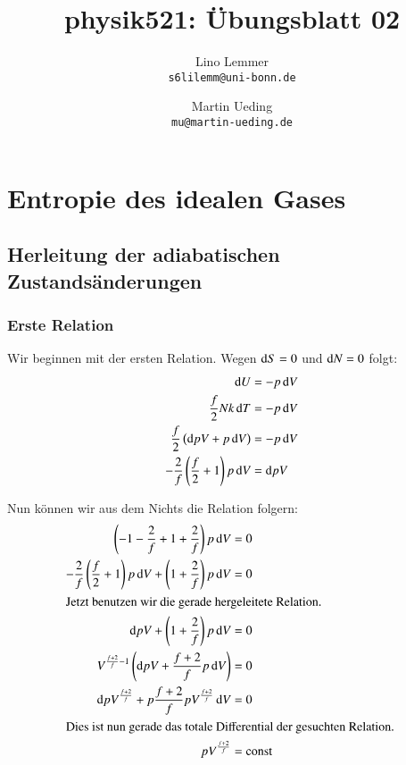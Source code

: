 

\setcounter{section}{1}
\renewcommand\thesection{H\,2.\arabic{section}}
\renewcommand\thesubsection{\thesection.\alph{subsection}}

\title{physik521: Übungsblatt 02}
\author{%
    Lino Lemmer \\ \small{\texttt{s6lilemm@uni-bonn.de}}
    \and
    Martin Ueding \\ \small{\texttt{mu@martin-ueding.de}}
}


\maketitle
\section{Entropie des idealen Gases}


\subsection{Herleitung der adiabatischen Zustandsänderungen}
\label{ssec:H2.1.a}

\subsubsection{Erste Relation}

Wir beginnen mit der ersten Relation. Wegen $\dif S = 0$ und $\dif N = 0$ folgt:
\begin{align*}
    \dif U &= - p \dif V \\
    \frac f2 N k \dif T &= - p \dif V \\
    \frac f2 \left( \dif p V + p \dif V \right) &= - p \dif V \\
        - \frac 2f \left( \frac f2 + 1 \right) p \dif V &= \dif p V
\end{align*}

Nun können wir aus dem Nichts die Relation folgern:
\begin{align*}
    \left( -1 - \frac 2f + 1 + \frac 2f \right) p \dif V &= 0 \\
    - \frac 2f \left( \frac f2 + 1 \right) p \dif V + \left( 1 + \frac 2f \right) p \dif V &= 0 \\
    \intertext{%
        Jetzt benutzen wir die gerade hergeleitete Relation.
    }
    \dif p V + \left( 1 + \frac 2f \right) p \dif V &= 0 \\
    V^{\frac{f+2}f -1} \left( \dif p V + \frac{f+2}f p \dif V \right) &= 0 \\
    \dif p V^{\frac{f+2}f} + p \frac{f+2}f p V^{\frac{f+2}f} \dif V &= 0 \\
    \intertext{%
        Dies ist nun gerade das totale Differential der
        gesuchten Relation.
    }
    p V^{\frac{f+2}f} &= \text{const}
\end{align*}

